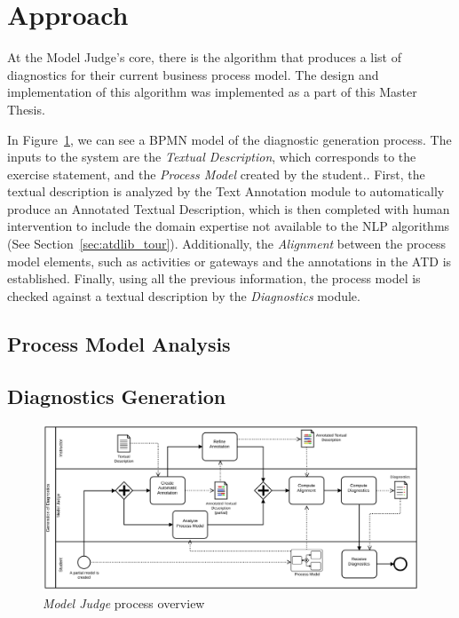 \section{Approach}
\label{sec:modeljudge_approach}

At the Model Judge's core, there is the algorithm that produces a list of
diagnostics for their current business process model. The design and
implementation of this algorithm was implemented as a part of this Master Thesis.

In Figure~\ref{fig:modeljudge_overview}, we can see a BPMN model of the
diagnostic generation process. The inputs to the system are the \emph{Textual
  Description}, which corresponds to the exercise statement, and the
\emph{Process Model} created by the student.. First, the textual description is
analyzed by the Text Annotation module to automatically produce an Annotated
Textual Description, which is then completed with human intervention to
include the domain expertise not available to the NLP algorithms (See
Section~\ref{sec:atdlib_tour}). Additionally, the \textit{Alignment} between the
process model elements, such as activities or gateways and the annotations in
the ATD is established. Finally, using all the previous information, the process
model is checked against a textual description by the \emph{Diagnostics} module.

\subsection{Process Model Analysis}

\subsection{Diagnostics Generation}
\label{sec:diagnostics_generation}


\begin{figure}[htb]
  \centering
  \includegraphics[width=\textwidth]{figures/overview_bpmn}
  \caption{\emph{Model Judge} process overview}
  \label{fig:modeljudge_overview}
\end{figure}

